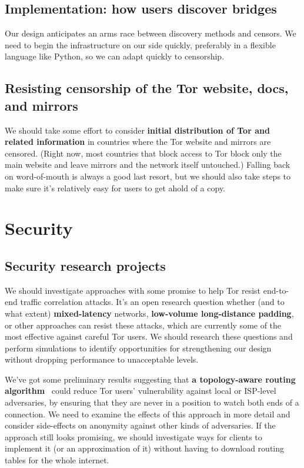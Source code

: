 \documentclass{article}
\begin{document}
\subsection{Implementation: how users discover bridges}

Our design anticipates an arms race between discovery methods and censors.
We need to begin the infrastructure on our side quickly, preferably in a
flexible language like Python, so we can adapt quickly to censorship.

\subsection{Resisting censorship of the Tor website, docs, and mirrors}

We should take some effort to consider {\bf initial distribution of Tor and
  related information} in countries where the Tor website and mirrors are
censored.  (Right now, most countries that block access to Tor block only the
main website and leave mirrors and the network itself untouched.)  Falling
back on word-of-mouth is always a good last resort, but we should also take
steps to make sure it's relatively easy for users to get ahold of a copy.

\section{Security}

\subsection{Security research projects}

We should investigate approaches with some promise to help Tor resist
end-to-end traffic correlation attacks.  It's an open research question
whether (and to what extent) {\bf mixed-latency} networks, {\bf low-volume
  long-distance padding}, or other approaches can resist these attacks, which
are currently some of the most effective against careful Tor users.  We
should research these questions and perform simulations to identify
opportunities for strengthening our design without dropping performance to
unacceptable levels. %

We've got some preliminary results suggesting that {\bf a topology-aware
  routing algorithm}~\cite{routing-zones} could reduce Tor users'
vulnerability against local or ISP-level adversaries, by ensuring that they
are never in a position to watch both ends of a connection.  We need to
examine the effects of this approach in more detail and consider side-effects
on anonymity against other kinds of adversaries.  If the approach still looks
promising, we should investigate ways for clients to implement it (or an
approximation of it) without having to download routing tables for the whole
internet.
\end{document}
